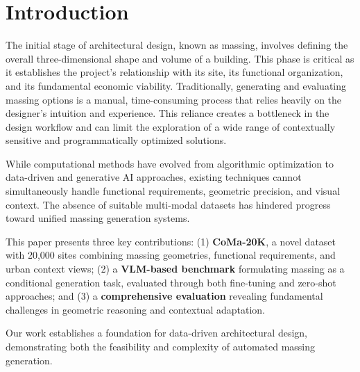 \section{Introduction}
\label{sec:introduction}

The initial stage of architectural design, known as massing, involves defining the overall three-dimensional shape and volume of a building. This phase is critical as it establishes the project's relationship with its site, its functional organization, and its fundamental economic viability. Traditionally, generating and evaluating massing options is a manual, time-consuming process that relies heavily on the designer's intuition and experience. This reliance creates a bottleneck in the design workflow and can limit the exploration of a wide range of contextually sensitive and programmatically optimized solutions.

While computational methods have evolved from algorithmic optimization to data-driven and generative AI approaches, existing techniques cannot simultaneously handle functional requirements, geometric precision, and visual context. The absence of suitable multi-modal datasets has hindered progress toward unified massing generation systems.

This paper presents three key contributions: (1) \textbf{CoMa-20K}, a novel dataset with 20,000 sites combining massing geometries, functional requirements, and urban context views; (2) a \textbf{VLM-based benchmark} formulating massing as a conditional generation task, evaluated through both fine-tuning and zero-shot approaches; and (3) a \textbf{comprehensive evaluation} revealing fundamental challenges in geometric reasoning and contextual adaptation.

Our work establishes a foundation for data-driven architectural design, demonstrating both the feasibility and complexity of automated massing generation.